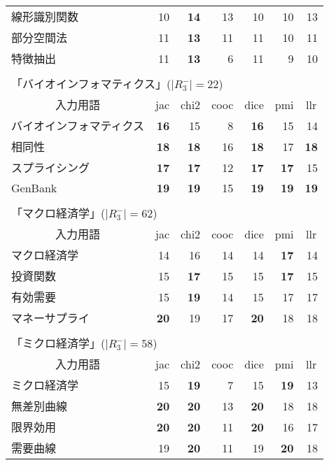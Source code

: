 \begin{table}
\begin{center}
\begin{tabular}{|l|rr|rrrr|}
   線形識別関数 & 10 & {\bf 14} & 13 & 10 & 10 & 13 \\
   部分空間法 & 11 & {\bf 13} & 11 & 11 & 10 & 11 \\
   特徴抽出 & 11 & {\bf 13} & 6 & 11 & 9 & 10 \\
   \hline
   \multicolumn{7}{l}{\tiny }\\[-5pt]
   \multicolumn{7}{l}{「バイオインフォマティクス」($|R_3^{-}|=22$)}\\
   \hline
   \multicolumn{1}{|c}{入力用語} & 
   \multicolumn{1}{|c}{jac} &
   \multicolumn{1}{c}{chi2} &
   \multicolumn{1}{|c}{cooc} &
   \multicolumn{1}{c}{dice} &
   \multicolumn{1}{c}{pmi} &
   \multicolumn{1}{c|}{llr} \\
   \hline
   バイオインフォマティクス & {\bf 16} & 15 & 8 & {\bf 16} & 15 & 14 \\
   相同性 & {\bf 18} & {\bf 18} & 16 & {\bf 18} & 17 & {\bf 18} \\
   スプライシング & {\bf 17} & {\bf 17} & 12 & {\bf 17} & {\bf 17} & 15 \\
   GenBank & {\bf 19} & {\bf 19} & 15 & {\bf 19} & {\bf 19} & {\bf 19} \\
   \hline
   \multicolumn{7}{l}{\tiny }\\[-5pt]
   \multicolumn{7}{l}{「マクロ経済学」($|R_3^{-}|=62$)}\\
   \hline
   \multicolumn{1}{|c}{入力用語} & 
   \multicolumn{1}{|c}{jac} &
   \multicolumn{1}{c}{chi2} &
   \multicolumn{1}{|c}{cooc} &
   \multicolumn{1}{c}{dice} &
   \multicolumn{1}{c}{pmi} &
   \multicolumn{1}{c|}{llr} \\
   \hline
   マクロ経済学 & 14 & 16 & 14 & 14 & {\bf 17} & 14 \\
   投資関数 & 15 & {\bf 17} & 15 & 15 & {\bf 17} & 15 \\
   有効需要 & 15 & {\bf 19} & 14 & 15 & 17 & 17 \\
   マネーサプライ & {\bf 20} & 19 & 17 & {\bf 20} & 18 & 18 \\
   \hline
   \multicolumn{7}{l}{\tiny }\\[-5pt]
   \multicolumn{7}{l}{「ミクロ経済学」($|R_3^{-}|=58$)}\\
   \hline
   \multicolumn{1}{|c}{入力用語} & 
   \multicolumn{1}{|c}{jac} &
   \multicolumn{1}{c}{chi2} &
   \multicolumn{1}{|c}{cooc} &
   \multicolumn{1}{c}{dice} &
   \multicolumn{1}{c}{pmi} &
   \multicolumn{1}{c|}{llr} \\
   \hline
   ミクロ経済学 & 15 & {\bf 19} & 7 & 15 & {\bf 19} & 13 \\
   無差別曲線 & {\bf 20} & {\bf 20} & 13 & {\bf 20} & 18 & 18 \\
   限界効用 & {\bf 20} & {\bf 20} & 11 & {\bf 20} & 16 & 17 \\
   需要曲線 & 19 & {\bf 20} & 11 & 19 & {\bf 20} & 18 \\
   \hline
  \end{tabular}
 \end{center}
\end{table}

